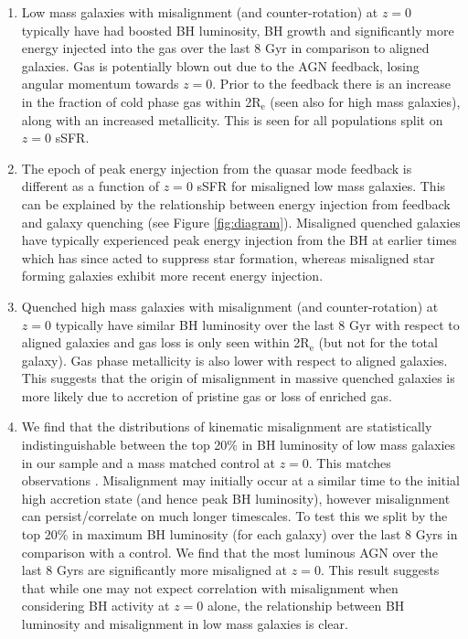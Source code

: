 \documentclass[fleqn,usenatbib]{mnras}
\begin{document}
\begin{enumerate}
    \item Low mass galaxies with misalignment (and counter-rotation) at $z=0$ typically have had boosted BH luminosity, BH growth and significantly more energy injected into the gas over the last 8 Gyr in comparison to aligned galaxies. Gas is potentially blown out due to the AGN feedback, losing angular momentum towards $z=0$. Prior to the feedback there is an increase in the fraction of cold phase gas within 2$\mathrm{R_{e}}$ (seen also for high mass galaxies), along with an increased metallicity. This is seen for all populations split on $z=0$ sSFR.
    
    \item The epoch of peak energy injection from the quasar mode feedback is different as a function of $z=0$ sSFR for misaligned low mass galaxies. This can be explained by the relationship between energy injection from feedback and galaxy quenching (see Figure \ref{fig:diagram}). Misaligned quenched galaxies have typically experienced peak energy injection from the BH at earlier times which has since acted to suppress star formation, whereas misaligned star forming galaxies exhibit more recent energy injection. 

    \item Quenched high mass galaxies with misalignment (and counter-rotation) at $z=0$ typically have similar BH luminosity over the last 8 Gyr with respect to aligned galaxies and gas loss is only seen within 2$\mathrm{R_{e}}$ (but not for the total galaxy). Gas phase metallicity is also lower with respect to aligned galaxies. This suggests that the origin of misalignment in massive quenched galaxies is more likely due to accretion of pristine gas or loss of enriched gas. 
    
    \item We find that the distributions of kinematic misalignment are statistically indistinguishable between the top 20\% in BH luminosity of low mass galaxies in our sample and a mass matched control at $z=0$. This matches observations \citep[see Figure 6 in][]{ilha2019}. Misalignment may initially occur at a similar time to the initial high accretion state (and hence peak BH luminosity), however misalignment can persist/correlate on much longer timescales. To test this we split by the top 20\% in maximum BH luminosity (for each galaxy) over the last 8 Gyrs in comparison with a control. We find that the most luminous AGN over the last 8 Gyrs are significantly more misaligned at $z=0$. This result suggests that while one may not expect correlation with misalignment when considering BH activity at $z=0$ alone, the relationship between BH luminosity and misalignment in low mass galaxies is clear. 
\end{enumerate}
\end{document}
